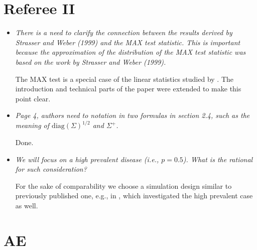 \documentclass{article}
\begin{document}
\section*{Referee II}
\begin{itemize}
\item
\textit{
There is a need to clarify the connection between the results derived 
by Strasser and Weber (1999) and the MAX test statistic. This is 
important because the approximation of the distribution of the MAX 
test statistic was based on the work by Strasser and Weber (1999).}

The MAX test is a special case of the linear statistics studied
by \cite{StrasserWeber1999}. The introduction and technical parts
of the paper were extended to make this point clear.

\item
\textit{Page 4, authors need to notation in two formulas in section 2.4, 
such as the meaning of $\text{diag}(\Sigma)^{1/2}$ and $\Sigma^+$.}

Done.

\item
\textit{
We will focus on a high prevalent disease (i.e., $p=0.5$). 
What is the rational for such consideration?}

For the sake of comparability we choose a simulation
design similar to previously published one, e.g., in
\cite{Neuhauser:2002}, which investigated the high prevalent 
case as well.

\end{itemize}

\section*{AE}
\end{document}
